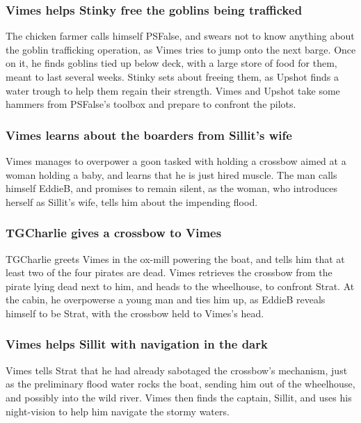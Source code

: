 \subsubsection{\Gls{Vimes} helps \Gls{Stinky} free the goblins being trafficked}
The chicken farmer calls himself \Gls{PSFalse}, and swears not to know anything about the goblin
trafficking operation, as \Gls{Vimes} tries to jump onto the next barge. Once on it, he finds
goblins tied up below deck, with a large store of food for them, meant to last several weeks.
\Gls{Stinky} sets about freeing them, as \Gls{Upshot} finds a water trough to help them regain their
strength. \Gls{Vimes} and \Gls{Upshot} take some hammers from \Gls{PSFalse}'s toolbox and prepare
to confront the pilots.

\subsubsection{\Gls{Vimes} learns about the boarders from \Gls{Sillit}'s wife}
\Gls{Vimes} manages to overpower a goon tasked with holding a crossbow aimed at a woman holding a
baby, and learns that he is just hired muscle. The man calls himself \Gls{EddieB}, and promises to
remain silent, as the woman, who introduces herself as \Gls{Sillit}'s wife, tells him about the
impending flood.

\subsubsection{\Gls{TGCharlie} gives a crossbow to \Gls{Vimes}}
\Gls{TGCharlie} greets \Gls{Vimes} in the ox-mill powering the boat, and tells him that at least
two of the four pirates are dead. \Gls{Vimes} retrieves the crossbow from the pirate lying dead next
to him, and heads to the wheelhouse, to confront \Gls{Strat}. At the cabin, he overpowerse a young
man and ties him up, as \Gls{EddieB} reveals himself to be \Gls{Strat}, with the crossbow held to
\Gls{Vimes}'s head.

\subsubsection{\Gls{Vimes} helps \Gls{Sillit} with navigation in the dark}
\Gls{Vimes} tells \Gls{Strat} that he had already sabotaged the crossbow's mechanism, just as
the preliminary flood water rocks the boat, sending him out of the wheelhouse, and possibly into
the wild river. \Gls{Vimes} then finds the captain, \Gls{Sillit}, and uses his night-vision to
help him navigate the stormy waters.

